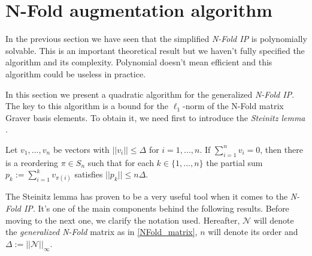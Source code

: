 \section{N-Fold augmentation algorithm}

In the previous section we have seen that the simplified \emph{N-Fold IP} is polynomially solvable. This is an important theoretical result but we haven't fully specified the algorithm and its complexity. Polynomial doesn't mean efficient and this algorithm could be useless in practice.

In this section we present a quadratic algorithm for the generalized \emph{N-Fold IP}. The key to this algorithm is a bound for the $\ell_1$-norm of the N-Fold matrix Graver basis elements. To obtain it, we need first to introduce the \textit{Steinitz lemma} \cite{STEINITZ:1913}.

\begin{lemma}
    Let $v_1,...,v_n$ be vectors with $||v_i|| \leq \Delta$ for $i = 1,...,n$. If $\sum_{i=1}^{n} v_i = 0$, then there is a reordering $\pi \in S_n$ such that for each $k \in \{1,...,n\}$ the partial sum $p_k := \sum_{i=1}^{k}v_{\pi(i)}$ satisfies $||p_k|| \leq n\Delta$.
\end{lemma}

The Steinitz lemma has proven to be a very useful tool when it comes to the \emph{N-Fold IP}. It's one of the main components behind the following results. Before moving to the next one, we clarify the notation used. Hereafter, $\mathcal{N}$ will denote the \emph{generalized N-Fold} matrix as in \ref{NFold_matrix}, $n$ will denote its order and $\Delta := ||\mathcal{N}||_\infty$. 


